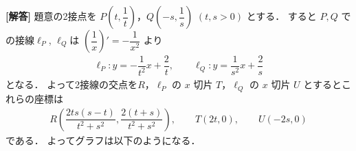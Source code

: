 \documentclass[../../main.tex]{subfiles}
\begin{document}
\begin{oframed}
  
\end{oframed}

{\bf [解答]}
題意の2接点を $P\left(t,\dfrac{1}{t}\right)$，$Q\left(-s,\dfrac{1}{s}\right)$ $(t,s>0)$ とする．
すると $P,Q$ での接線$\ell_P$, $\ell_Q$は $\left(\dfrac{1}{x}\right)'=-\dfrac{1}{x^2}$ より
\begin{align}
  \ell_P: y=-\dfrac{1}{t^2}x+\dfrac{2}{t}, \qquad \ell_Q: y=\dfrac{1}{s^2}x+\dfrac{2}{s}
\end{align}
となる．
よって2接線の交点を$R$，$\ell_P$ の $x$ 切片 $T$，$\ell_Q$ の $x$ 切片 $U$ とするとこれらの座標は
\begin{align}
  R\left(\dfrac{2ts(s-t)}{t^2+s^2},\dfrac{2(t+s)}{t^2+s^2}\right), \qquad T(2t,0), \qquad U(-2s,0) \label{eq:1}
\end{align}
である．
よってグラフは以下のようになる．
\end{document}
